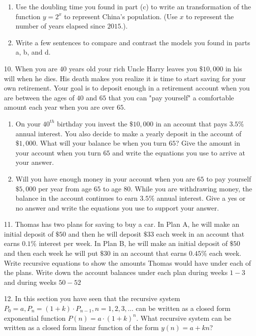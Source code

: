 \documentclass[10pt,]{book}
\theoremstyle{plain}
\theoremstyle{definition}
\theoremstyle{definition}
\theoremstyle{definition}
\numberwithin{equation}{section}
\begin{document}
\begin{exerciselist}
\begin{enumerate}[label=(\alph*)]
\item\hypertarget{li-61}{}Use the doubling time you found in part (c) to write an transformation of the function \(y=2^x\) to represent China's population. (Use \(x\) to represent the number of years elapsed since \(2015\).).%
\item\hypertarget{li-62}{}Write a few sentences to compare and contrast the models you found in parts a, b, and d.%
\end{enumerate}
%
\par\smallskip
\item[10.]\hypertarget{exercise-29}{}When you are \(40\) years old your rich Uncle Harry leaves you \(\$10,000\) in his will when he dies.  His death makes you realize it is time to start saving for your own retirement. Your goal is to deposit enough in a retirement account when you are between the ages of \(40\) and \(65\) that you can "pay yourself" a comfortable amount each year when you are over \(65\). \leavevmode%
\begin{enumerate}[label=(\alph*)]
\item\hypertarget{li-63}{}On your \(40^{th}\) birthday you invest the \(\$10,000\) in an account that pays \(3.5\%\) annual interest.  You also decide to make a yearly deposit in the account of \(\$1,000\). What will your balance be when you turn \(65\)?  Give the amount in your account when you turn \(65\) and write the equations you use to arrive at your answer.%
\item\hypertarget{li-64}{}Will you have enough money in your account when you are \(65\) to pay yourself \(\$5,000\) per year from age \(65\) to age \(80\).  While you are withdrawing money, the balance in the account continues to earn \(3.5\%\) annual interest.  Give a yes or no answer and write the equations you use to support your answer.%
\end{enumerate}
%
\par\smallskip
\item[11.]\hypertarget{exercise-30}{}Thomas has two plans for saving to buy a car.  In Plan A, he will make an initial deposit of \(\$50\) and then he will deposit \(\$33\) each week in an account that earns \(0.1\%\) interest per week.  In Plan B, he will make an initial deposit of \(\$50\) and then each week he will put \(\$30\) in an account that earns \(0.45\%\) each week. Write recursive equations to show the amounts Thomas would have under each of the plans. Write down the account balances under each plan during weeks \(1 - 3\) and during weeks \(50 - 52\)%
\par\smallskip
\item[12.]\hypertarget{exercise-31}{}In this section you have seen that the recursive system \(P_0=a, P_n=(1+k) \cdot P_{n-1}, n = 1, 2, 3, ...\) can be written as a closed form exponential function \(P(n)=a \cdot (1+k)^n\). What recursive system can be written as a closed form linear function of the form \(y(n)=a+kn\)?%
\par\smallskip
\end{exerciselist}
\typeout{************************************************}
\typeout{************************************************}
\end{document}
